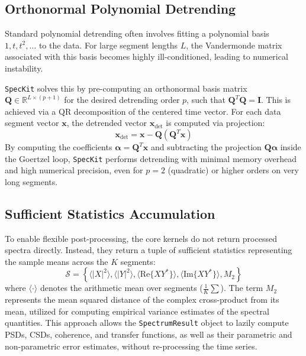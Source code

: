 \documentclass[final, 5p, times, twocolumn, number, sort&compress]{elsarticle}
\newcommand{\speckit}{\texttt{SpecKit}}
\begin{document}
\subsection{Orthonormal Polynomial Detrending}
\label{sec:detrending}

Standard polynomial detrending often involves fitting a polynomial basis $1, t, t^2, \dots$ to the data. For large segment lengths $L$, the Vandermonde matrix associated with this basis becomes highly ill-conditioned, leading to numerical instability. 

\speckit{} solves this by pre-computing an orthonormal basis matrix $\mathbf{Q} \in \mathbb{R}^{L \times (p+1)}$ for the desired detrending order $p$, such that $\mathbf{Q}^T \mathbf{Q} = \mathbf{I}$. This is achieved via a QR decomposition of the centered time vector. For each data segment vector $\mathbf{x}$, the detrended vector $\mathbf{x}_{\text{det}}$ is computed via projection:
\begin{equation}
    \mathbf{x}_{\text{det}} = \mathbf{x} - \mathbf{Q}(\mathbf{Q}^T \mathbf{x})
\end{equation}
By computing the coefficients $\boldsymbol{\alpha} = \mathbf{Q}^T \mathbf{x}$ and subtracting the projection $\mathbf{Q}\boldsymbol{\alpha}$ inside the Goertzel loop, \speckit{} performs detrending with minimal memory overhead and high numerical precision, even for $p=2$ (quadratic) or higher orders on very long segments.

\subsection{Sufficient Statistics Accumulation}

To enable flexible post-processing, the core kernels do not return processed spectra directly. Instead, they return a tuple of sufficient statistics representing the sample means across the $K$ segments:
\begin{equation}
    \mathcal{S} = \left\{ \langle |X|^2 \rangle, \langle |Y|^2 \rangle, \langle \text{Re}\{X Y^*\} \rangle, \langle \text{Im}\{X Y^*\} \rangle, M_2 \right\}
\end{equation}
where $\langle \cdot \rangle$ denotes the arithmetic mean over segments ($\frac{1}{K}\sum$). The term $M_2$ represents the mean squared distance of the complex cross-product from its mean, utilized for computing empirical variance estimates of the spectral quantities. This approach allows the \texttt{SpectrumResult} object to lazily compute PSDs, CSDs, coherence, and transfer functions, as well as their parametric and non-parametric error estimates, without re-processing the time series.
\end{document}
